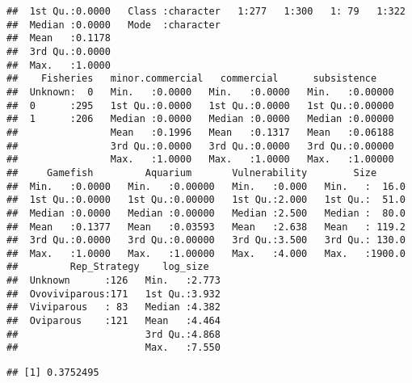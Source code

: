 \documentclass[]{article}
\newenvironment{Shaded}{\begin{snugshade}}{\end{snugshade}}
\newcommand{\KeywordTok}[1]{\textcolor[rgb]{0.13,0.29,0.53}{\textbf{#1}}}
\newcommand{\DataTypeTok}[1]{\textcolor[rgb]{0.13,0.29,0.53}{#1}}
\newcommand{\DecValTok}[1]{\textcolor[rgb]{0.00,0.00,0.81}{#1}}
\newcommand{\CommentTok}[1]{\textcolor[rgb]{0.56,0.35,0.01}{\textit{#1}}}
\newcommand{\OperatorTok}[1]{\textcolor[rgb]{0.81,0.36,0.00}{\textbf{#1}}}
\newcommand{\NormalTok}[1]{#1}
\begin{document}
\begin{verbatim}
##  1st Qu.:0.0000   Class :character   1:277   1:300   1: 79   1:322     
##  Median :0.0000   Mode  :character                                     
##  Mean   :0.1178                                                        
##  3rd Qu.:0.0000                                                        
##  Max.   :1.0000                                                        
##    Fisheries   minor.commercial   commercial      subsistence     
##  Unknown:  0   Min.   :0.0000   Min.   :0.0000   Min.   :0.00000  
##  0      :295   1st Qu.:0.0000   1st Qu.:0.0000   1st Qu.:0.00000  
##  1      :206   Median :0.0000   Median :0.0000   Median :0.00000  
##                Mean   :0.1996   Mean   :0.1317   Mean   :0.06188  
##                3rd Qu.:0.0000   3rd Qu.:0.0000   3rd Qu.:0.00000  
##                Max.   :1.0000   Max.   :1.0000   Max.   :1.00000  
##     Gamefish         Aquarium       Vulnerability        Size       
##  Min.   :0.0000   Min.   :0.00000   Min.   :0.000   Min.   :  16.0  
##  1st Qu.:0.0000   1st Qu.:0.00000   1st Qu.:2.000   1st Qu.:  51.0  
##  Median :0.0000   Median :0.00000   Median :2.500   Median :  80.0  
##  Mean   :0.1377   Mean   :0.03593   Mean   :2.638   Mean   : 119.2  
##  3rd Qu.:0.0000   3rd Qu.:0.00000   3rd Qu.:3.500   3rd Qu.: 130.0  
##  Max.   :1.0000   Max.   :1.00000   Max.   :4.000   Max.   :1900.0  
##         Rep_Strategy    log_size    
##  Unknown      :126   Min.   :2.773  
##  Ovoviviparous:171   1st Qu.:3.932  
##  Viviparous   : 83   Median :4.382  
##  Oviparous    :121   Mean   :4.464  
##                      3rd Qu.:4.868  
##                      Max.   :7.550
\end{verbatim}

\begin{Shaded}
\end{Shaded}

\begin{verbatim}
## [1] 0.3752495
\end{verbatim}

\begin{Shaded}
\end{Shaded}
\end{document}

